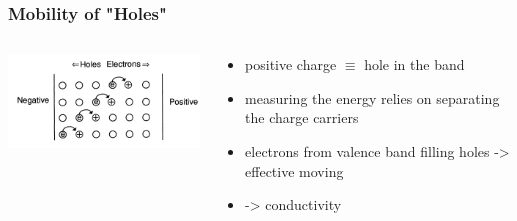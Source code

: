 \documentclass[aspectratio=1610, 12pt]{beamer}
\begin{document}
\begin{frame}\frametitle{Mobility of "Holes"}
  \begin{columns}
    \begin{column}[c]{0.48\textwidth}
      \includegraphics[width=\textwidth]{plots/holes.png}
    \end{column}
    \begin{column}[c]{0.48\textwidth}
      \begin{itemize}
        \item positive charge $\equiv$ hole in the band
        \item measuring the energy relies on separating the charge carriers
        \item electrons from valence band filling holes -> effective moving
        \item -> conductivity
      \end{itemize}
    \end{column}
  \end{columns}
\end{frame}
\end{document}
